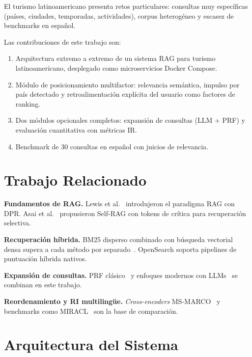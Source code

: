 \documentclass[runningheads]{llncs}
\begin{document}
El turismo latinoamericano presenta retos particulares: consultas muy
espec\'ificas (pa\'ises, ciudades, temporadas, actividades), corpus
heterog\'eneo y escasez de benchmarks en espa\~nol.

Las contribuciones de este trabajo son:
\begin{enumerate}
  \item Arquitectura extremo a extremo de un sistema RAG para turismo
  latinoamericano, desplegado como microservicios Docker Compose.
  \item M\'odulo de posicionamiento multifactor: relevancia sem\'antica,
  impulso por pa\'is detectado y retroalimentaci\'on expl\'icita del
  usuario como factores de ranking.
  \item Dos m\'odulos opcionales completos: expansi\'on de consultas
  (LLM + PRF) y evaluaci\'on cuantitativa con m\'etricas IR.
  \item Benchmark de 30 consultas en espa\~nol con juicios de relevancia.
\end{enumerate}

\section{Trabajo Relacionado}
\label{sec:related}

\textbf{Fundamentos de RAG.}
Lewis et al.~\cite{lewis2020rag} introdujeron el paradigma RAG con DPR.
Asai et al.~\cite{asai2023selfrag} propusieron Self-RAG con tokens de
cr\'itica para recuperaci\'on selectiva.

\textbf{Recuperaci\'on h\'ibrida.}
BM25 disperso combinado con b\'usqueda vectorial densa supera a cada
m\'etodo por separado~\cite{ma2021replication,luan2021sparse}. OpenSearch
soporta pipelines de puntuaci\'on h\'ibrida nativos.

\textbf{Expansi\'on de consultas.}
PRF cl\'asico~\cite{rocchio1971relevance} y enfoques modernos con
LLMs~\cite{gao2022hyde} se combinan en este trabajo.

\textbf{Reordenamiento y RI multiling\"ue.}
\textit{Cross-encoders} MS-MARCO~\cite{reimers2019sentence} y benchmarks
como MIRACL~\cite{zhang2023miracl} son la base de comparaci\'on.

\section{Arquitectura del Sistema}
\label{sec:architecture}
\end{document}
